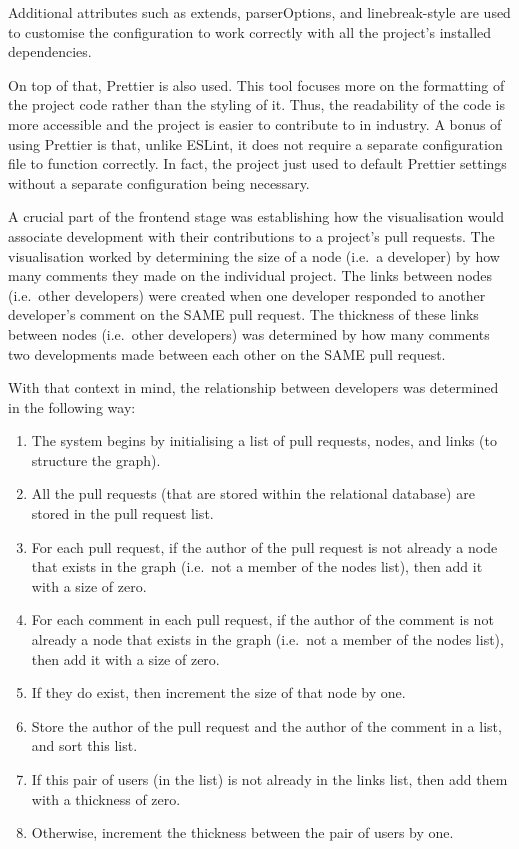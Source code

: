 Additional attributes such as extends, parserOptions,
and linebreak-style are used
to customise the configuration to work correctly with all the project's installed dependencies.

On top of that, Prettier is also used.
This tool focuses more on the formatting of the project code rather than the styling of it.
Thus, the readability of the code is more accessible and the project is easier to contribute to in industry.
A bonus of using Prettier is that, unlike ESLint,
it does not require a separate configuration file to function correctly.
In fact, the project just used to default Prettier settings without a separate configuration being necessary.

A crucial part of the frontend stage was establishing
how the visualisation would associate development with their contributions to a project's pull requests.
The visualisation worked by determining the size of a node
(i.e.\ a developer) by how many comments they made on the individual project.
The links between nodes (i.e.\ other developers)
were created when one developer responded to another developer's comment on the SAME pull request.
The thickness of these links between nodes (i.e.\ other developers)
was determined by how many comments two developments made between each other on the SAME pull request.

With that context in mind, the relationship between developers was determined in the following way:

\begin{enumerate}
    \item The system begins by initialising a list of pull requests, nodes, and links (to structure the graph).
    \item
    All the pull requests (that are stored within the relational database) are stored in the pull request list.
    \item For each pull request, if the author of the pull request is not already a node that exists in the graph (i.e.\ not a member of the nodes list), then add it with a size of zero.
    \item For each comment in each pull request, if the author of the comment is not already a node that exists in the graph (i.e.\ not a member of the nodes list), then add it with a size of zero.
    \item If they do exist, then increment the size of that node by one.
    \item Store the author of the pull request and the author of the comment in a list, and sort this list.
    \item If this pair of users (in the list) is not already in the links list, then add them with a thickness of zero.
    \item Otherwise, increment the thickness between the pair of users by one.
\end{enumerate}


